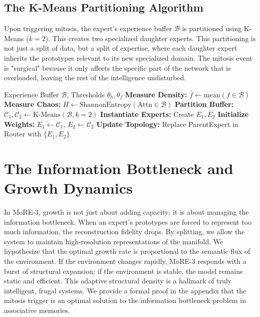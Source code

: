 \documentclass[11pt,hidelinks]{article}
\begin{document}
\subsection{The K-Means Partitioning Algorithm}
Upon triggering mitosis, the expert's experience buffer $\mathcal{B}$ is partitioned using K-Means ($k=2$). This creates two specialized daughter experts. This partitioning is not just a split of data, but a split of expertise, where each daughter expert inherits the prototypes relevant to its new specialized domain. The mitosis event is "surgical" because it only affects the specific part of the network that is overloaded, leaving the rest of the intelligence undisturbed.

\begin{algorithm}[h]
\caption{Autonomous Mitosis Trigger and Structural Split}
\begin{algorithmic}[1]
\REQUIRE Experience Buffer $\mathcal{B}$, Thresholds $\theta_h, \theta_f$
\STATE \textbf{Measure Density:} $\bar{f} \gets \text{mean}(f \in \mathcal{B})$
\STATE \textbf{Measure Chaos:} $H \gets \text{ShannonEntropy}(\text{Attn} \in \mathcal{B})$
    \STATE \textbf{Partition Buffer:} $\mathcal{C}_1, \mathcal{C}_2 \gets \text{K-Means}(\mathcal{B}, k=2)$
    \STATE \textbf{Instantiate Experts:} Create $E_1, E_2$
    \STATE \textbf{Initialize Weights:} $E_1 \leftarrow \mathcal{C}_1$, $E_2 \leftarrow \mathcal{C}_2$
    \STATE \textbf{Update Topology:} Replace ParentExpert in Router with $\{E_1, E_2\}$
\ENDIF
\end{algorithmic}
\end{algorithm}

\section{The Information Bottleneck and Growth Dynamics}
In MoRE-3, growth is not just about adding capacity; it is about managing the information bottleneck. When an expert's prototypes are forced to represent too much information, the reconstruction fidelity drops. By splitting, we allow the system to maintain high-resolution representations of the manifold. We hypothesize that the optimal growth rate is proportional to the semantic flux of the environment. If the environment changes rapidly, MoRE-3 responds with a burst of structural expansion; if the environment is stable, the model remains static and efficient. This adaptive structural density is a hallmark of truly intelligent, frugal systems. We provide a formal proof in the appendix that the mitosis trigger is an optimal solution to the information bottleneck problem in associative memories.
\end{document}
